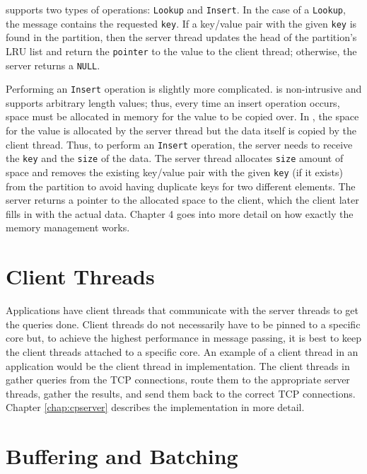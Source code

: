 \cphash{} supports two types of operations: \texttt{Lookup} and \texttt{Insert}. 
In the case of a \texttt{Lookup}, the message contains the requested \texttt{key}. If a key/value pair with the given 
\texttt{key} is found in the partition, then the server thread updates the head of the partition's LRU list and return the \texttt{pointer} to the 
value to the client thread; otherwise, the server returns a \texttt{NULL}.

Performing an \texttt{Insert} operation is slightly more complicated. \cphash{} is non-intrusive and 
supports arbitrary length values; thus, every time an insert operation occurs, space must be allocated 
in memory for the value to be copied over. In \cphash{}, the space for the value is allocated by the server 
thread but the data itself is copied by the client thread. Thus, to perform an \texttt{Insert} operation, the server needs 
to receive the \texttt{key} and the \texttt{size} of the data. The server thread allocates \texttt{size} amount of space and removes the existing 
key/value pair with the given \texttt{key} (if it exists) from the partition to avoid having duplicate keys for two different 
elements. The server returns a pointer to the allocated space to the client, which the client later fills in with the
actual data. Chapter 4 goes into more detail on how exactly the memory management works. 
  
\section{Client Threads}
\label{sec:clientthreads}

Applications have client threads that communicate with the server threads to get the queries done. 
Client threads do not necessarily have to be pinned to a specific core but, to achieve the highest performance 
in message passing, it is best to keep the client threads attached to a specific core. An example of a client 
thread in an application would be the client thread in \cpserver{} implementation. The client threads in \cpserver{} 
gather queries from the TCP connections, route them to the appropriate server threads, gather the results, and 
send them back to the correct TCP connections. Chapter \ref{chap:cpserver} describes the \cpserver{} implementation
in more detail.

\section{Buffering and Batching}
\label{sec:msgpassing}

